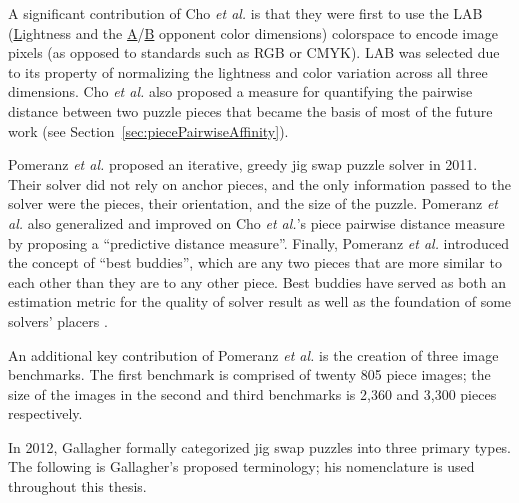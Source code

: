 \documentclass{report}
\begin{document}
A significant contribution of Cho \textit{et al.} is that they were first to use the LAB  (\underline{L}ightness and the \underline{A}/\underline{B} opponent color dimensions) colorspace to encode image pixels (as opposed to standards such as RGB or CMYK).  LAB was selected due to its property of normalizing the lightness and color variation across all three dimensions.  Cho \textit{et al.} also proposed a measure for quantifying the pairwise distance between two puzzle pieces that became the basis of most of the future work (see Section~\ref{sec:piecePairwiseAffinity}).  

Pomeranz \textit{et al.} \cite{pomeranz2011} proposed an iterative, greedy jig swap puzzle solver in 2011.  Their solver did not rely on anchor pieces, and the only information passed to the solver were the pieces, their orientation, and the size of the puzzle.  Pomeranz \textit{et al.} also generalized and improved on Cho \textit{et al.}'s piece pairwise distance measure by proposing a ``predictive distance measure''.  Finally, Pomeranz \textit{et al.} introduced the concept of ``best buddies'', which are any two pieces that are more similar to each other than they are to any other piece.  Best buddies have served as both an estimation metric for the quality of solver result as well as the foundation of some solvers' placers \cite{paikin2015}.

An additional key contribution of Pomeranz \textit{et al.} is the creation of three image benchmarks.  The first benchmark is comprised of twenty 805 piece images; the size of the images in the second and third benchmarks is 2,360 and 3,300 pieces respectively.

In 2012, Gallagher \cite{gallagher2012} formally categorized jig swap puzzles into three primary types.  The following is Gallagher's proposed terminology; his nomenclature is used throughout this thesis.
\end{document}
